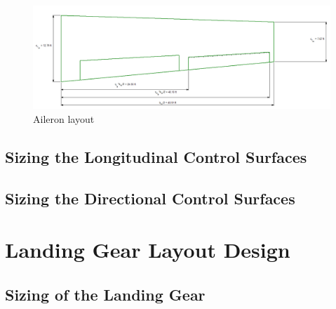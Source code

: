 \documentclass[conf]{new-aiaa}
\begin{document}
\begin{figure}[H]
    \includegraphics[width=\textwidth]{Report3Printouts/Wing_and_Aileron/aileron_sizing_plot.png}
    \caption{Aileron layout}
    \label{fig:aileron_sizing_plot}
\end{figure}

\subsection{Sizing the Longitudinal Control Surfaces}
\subsection{Sizing the Directional Control Surfaces}

\section{Landing Gear Layout Design}
\subsection{Sizing of the Landing Gear}
\end{document}
